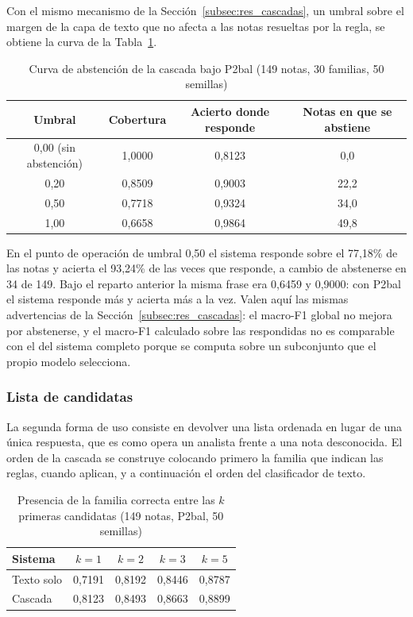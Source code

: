Con el mismo mecanismo de la Sección~\ref{subsec:res_cascadas}, un umbral sobre el margen de la capa de texto que no afecta a las notas resueltas por la regla, se obtiene la curva de la Tabla~\ref{tab:abstencion_p2bal}.

\begin{table}[ht]
\centering
\caption{Curva de abstención de la cascada bajo P2bal (149 notas, 30 familias, 50 semillas)}
\label{tab:abstencion_p2bal}
\begin{tabular}{|c|c|c|c|}
\hline
\textbf{Umbral} & \textbf{Cobertura} & \textbf{Acierto donde responde} & \textbf{Notas en que se abstiene} \\
\hline
0,00 (sin abstención) & 1,0000 & 0,8123 & 0,0 \\
0,20 & 0,8509 & 0,9003 & 22,2 \\
0,50 & 0,7718 & 0,9324 & 34,0 \\
1,00 & 0,6658 & 0,9864 & 49,8 \\
\hline
\end{tabular}
\end{table}

En el punto de operación de umbral 0,50 el sistema responde sobre el 77,18\% de las notas y acierta el 93,24\% de las veces que responde, a cambio de abstenerse en 34 de 149. Bajo el reparto anterior la misma frase era 0,6459 y 0,9000: con P2bal el sistema responde más y acierta más a la vez. Valen aquí las mismas advertencias de la Sección~\ref{subsec:res_cascadas}: el macro-F1 global no mejora por abstenerse, y el macro-F1 calculado sobre las respondidas no es comparable con el del sistema completo porque se computa sobre un subconjunto que el propio modelo selecciona.

\subsubsection*{Lista de candidatas}

La segunda forma de uso consiste en devolver una lista ordenada en lugar de una única respuesta, que es como opera un analista frente a una nota desconocida. El orden de la cascada se construye colocando primero la familia que indican las reglas, cuando aplican, y a continuación el orden del clasificador de texto.

\begin{table}[ht]
\centering
\caption{Presencia de la familia correcta entre las $k$ primeras candidatas (149 notas, P2bal, 50 semillas)}
\label{tab:topk}
\begin{tabular}{|l|c|c|c|c|}
\hline
\textbf{Sistema} & \textbf{$k=1$} & \textbf{$k=2$} & \textbf{$k=3$} & \textbf{$k=5$} \\
\hline
Texto solo & 0,7191 & 0,8192 & 0,8446 & 0,8787 \\
Cascada & 0,8123 & 0,8493 & 0,8663 & 0,8899 \\
\hline
\end{tabular}
\end{table}

